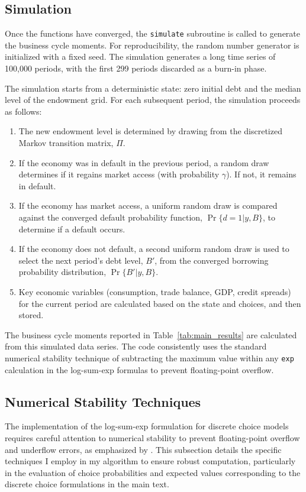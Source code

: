\documentclass[12pt]{article}
\theoremstyle{plain}
\begin{document}
\subsection{Simulation}
Once the functions have converged, the \texttt{simulate} subroutine is called
to generate the business cycle moments. For reproducibility, the random number
generator is initialized with a fixed seed. The simulation generates a long
time series of 100,000 periods, with the first 299 periods discarded as a
burn-in phase.

The simulation starts from a deterministic state: zero initial debt and the
median level of the endowment grid. For each subsequent period, the simulation
proceeds as follows:
\begin{enumerate}
	\item The new endowment level is determined by drawing from the discretized Markov
	      transition matrix, $\Pi$.
	\item If the economy was in default in the previous period, a random draw determines
	      if it regains market access (with probability $\gamma$). If not, it remains in
	      default.
	\item If the economy has market access, a uniform random draw is compared against the
	      converged default probability function, $\Pr\{d=1|y,B\}$, to determine if a
	      default occurs.
	\item If the economy does not default, a second uniform random draw is used to select
	      the next period's debt level, $B'$, from the converged borrowing probability
	      distribution, $\Pr\{B'|y,B\}$.
	\item Key economic variables (consumption, trade balance, GDP, credit spreads) for
	      the current period are calculated based on the state and choices, and then
	      stored.
\end{enumerate}
The business cycle moments reported in Table~\ref{tab:main_results} are calculated from this simulated data series. The code consistently uses the standard numerical stability technique of
subtracting the maximum value within any \texttt{exp} calculation in the
log-sum-exp formulas to prevent floating-point overflow.

\subsection{Numerical Stability Techniques}\label{app:numerical_stability}

The implementation of the log-sum-exp formulation for discrete choice models
requires careful attention to numerical stability to prevent floating-point
overflow and underflow errors, as emphasized by \citep{MIHALACHEOREEF2024}.
This subsection details the specific techniques I employ in my algorithm to
ensure robust computation, particularly in the evaluation of choice
probabilities and expected values corresponding to the discrete choice
formulations in the main text.
\end{document}
